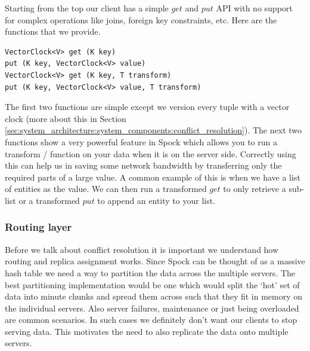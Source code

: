 \documentclass[twocolumn]{article}
\newcommand{\projectname}{Spock}
\begin{document}
Starting from the top our client has a simple $get$ and $put$ API with no support for complex operations like joins, foreign key constraints, etc. Here are the functions that we provide. 

\scriptsize
\begin{verbatim}
VectorClock<V> get (K key)
put (K key, VectorClock<V> value)
VectorClock<V> get (K key, T transform)
put (K key, VectorClock<V> value, T transform)
\end{verbatim}
\normalsize

The first two functions are simple except we version every tuple with a vector clock (more about this in Section \ref{sec:system_architecture:system_components:conflict_resolution}). The next two functions show a very powerful feature in \projectname{} which allows you to run a transform / function on your data when it is on the server side. Correctly using this can help us in saving some network bandwidth by transferring only the required parts of a large value. A common example of this is when we have a list of entities as the value. We can then run a transformed $get$ to only retrieve a sub-list or a transformed $put$ to append an entity to your list. 


\subsubsection {Routing layer }  
\label{sec:system_architecture:system_components:routing_layer}

Before we talk about conflict resolution it is important we understand how routing and replica assignment works. Since \projectname{} can be thought of as a massive hash table we need a way to partition the data across the multiple servers. The best partitioning implementation would be one which would split the `hot' set of data into minute chunks and spread them across such that they fit in memory on the individual servers. Also server failures, maintenance or just being overloaded are common scenarios. In such cases we definitely don't want our clients to stop serving data. This motivates the need to also replicate the data onto multiple servers. 
\end{document}

